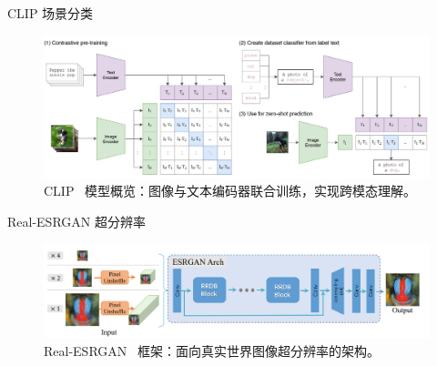   \begin{refsection}
  \begin{frame}{CLIP 场景分类}
    \begin{figure}
      \centering
      \includegraphics[width=\linewidth]{figs/clip.png}
      \caption{\scriptsize CLIP~\parencite{radfordLearningTransferableVisual2021} 模型概览：图像与文本编码器联合训练，实现跨模态理解。}
    \end{figure}

    \bottomleftrefs
  \end{frame}
  \end{refsection}
  
  \begin{refsection}
  \begin{frame}{Real-ESRGAN 超分辨率}
    \begin{figure}
      \centering
      \includegraphics[width=\linewidth]{figs/realesrgan.png}
      \caption{\scriptsize Real-ESRGAN~\parencite{wangRealESRGANTrainingRealWorld2021b} 框架：面向真实世界图像超分辨率的架构。}
    \end{figure}
    \bottomleftrefs
  \end{frame}
  \end{refsection}

